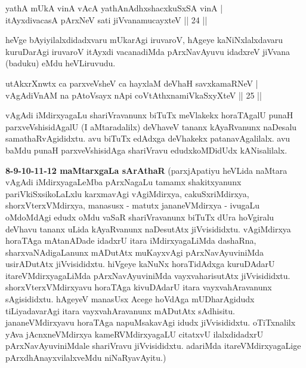 
\begin{shl}
yathA mUkA vinA vAcA yathA\s nAdhxshacxkuSxSA vinA | \\
itAyxdivacasA pArxNeV sati jiVvanamucayxteV \hfill|| 24 || 
\end{shl}

\begin{artha}
heVge bAyiyilalxdidadxvaru mUkarAgi iruvaroV, hAgeye kaNiNxlalxdavaru kuruDarAgi iruvaroV itAyxdi vacanadiMda pArxNavAyuvu idadxreV jiVvana (baduku) eMdu heVLiruvudu.
\end{artha}

\begin{shl}
utAkxrXnwtx ca parxveVsheV ca hayxlaM deVhaH savxkamaRNeV | \\
vAgAdiVnAM na pAtoV\s sayx nApi coVtAthxnamiVkaSxyXteV \hfill|| 25 || 
\end{shl}

\begin{artha}
vAgAdi iMdirxyagaLu shariVravanunx biTuTx meVlakekx horaTAgalU punaH parxveVshisidAgalU (I aMtaradalilx) deVhaveV tananx kAyaRvanunx naDesalu samathaRvAgididxtu. avu biTuTx edAdxga deVhakekx patanavAgalilalx. avu baMdu punaH parxveVshisidAga shariVravu edudxkoMDidUdx kANisalilalx.
\end{artha}

\begin{artha}
\textbf{8-9-10-11-12 maMtarxgaLa sArAthaR \ndash }
(parxjApatiyu heVLida naMtara vAgAdi iMdirxyagaLeMba pArxNagaLu tamamx shakitxyanunx pariVkiSxsikoLaLxlu karxmavAgi vAgiMdirxya, cakuSxriMdirxya, shorxVterxVMdirxya, manasusx - matutx jananeVMdirxya - ivugaLu oMdoMdAgi edudx oMdu vaSaR shariVravanunx biTuTx dUra hoVgiralu deVhavu tananx uLida kAyaRvanunx naDesutAtx jiVvisididxtu. vAgiMdirxya horaTAga mAtanADade idadxrU itara iMdirxyagaLiMda dashaRna, sharxvaNAdigaLanunx mADutAtx muKayxvAgi pArxNavAyuviniMda usirADutAtx jiVvisididxtu. hiVgeye kaNuNx horaTidAdxga kuruDAdarU itareVMdirxyagaLiMda pArxNavAyuviniMda vayxvaharisutAtx jiVvisididxtu. shorxVterxVMdirxyavu horaTAga kivuDAdarU itara vayxvahAravanunx sAgisididxtu. hAgeyeV manasUsx Acege hoVdAga mUDharAgidudx tiLiyadavarAgi itara vayxvahAravanunx mADutAtx sAdhisitu. jananeVMdirxyavu horaTAga napuMsakavAgi idudx jiVvisididxtu. oTiTxnalilx yAva jAcnxneVMdirxya kameRVMdirxyagaLU citatxvU ilalxdidadxrU pArxNavAyuviniMdale shariVravu jiVvisididxtu. adariMda itareVMdirxyagaLige pArxdhAnayxvilalxveMdu niNaRyavAyitu.)
\end{artha}

